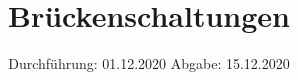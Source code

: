
\usepackage{pdfpages}

\subject{V302}
\title{Brückenschaltungen}
\date{%
  Durchführung: 01.12.2020
  \hspace{3em}
  Abgabe: 15.12.2020
}



\maketitle
\thispagestyle{empty}
\tableofcontents
\newpage






\nocite{sample}
\printbibliography{}




